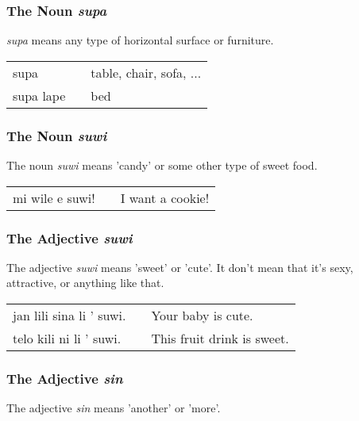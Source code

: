 \subsubsection*{The Noun \textit{supa}}
%
%
\textit{supa} means any type of horizontal surface or furniture. 

\begin{supertabular}{p{5,5cm}|ll}
supa  && table, chair, sofa, ...  \\
supa lape &&  bed \\
\end{supertabular} 

%
\subsubsection*{The Noun \textit{suwi}}
%

The noun \textit{suwi} means  'candy' or some other type of sweet food. 

\begin{supertabular}{p{5,5cm}|ll}
mi wile e suwi! && I want a cookie! \\
\end{supertabular} 

%
\subsubsection*{The Adjective \textit{suwi}}
%

The adjective \textit{suwi} means 'sweet' or 'cute'.
It don't mean that it's sexy, attractive, or anything like that. 

\begin{supertabular}{p{5,5cm}|ll}
jan lili sina li ' suwi. && Your baby is cute. \\
telo kili ni li ' suwi. && This fruit drink is sweet. \\
\end{supertabular} 

%
\subsubsection*{The Adjective  \textit{sin}}
%
%
The adjective \textit{sin} means 'another' or 'more'. 

